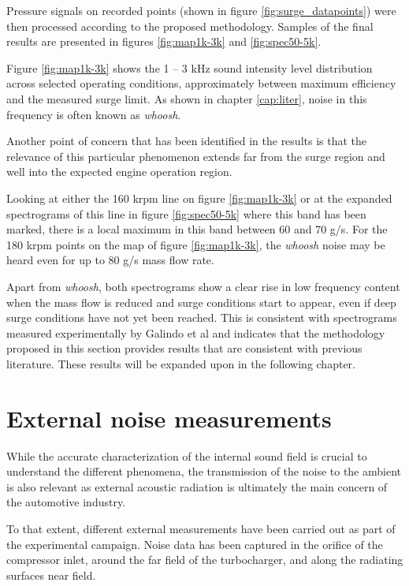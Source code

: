 Pressure signals on recorded points (shown in figure \ref{fig:surge_datapoints}) were then processed according to the proposed methodology. Samples of the final results are presented in figures \ref{fig:map1k-3k} and \ref{fig:spec50-5k}.

Figure \ref{fig:map1k-3k} shows the 1 -- 3 kHz sound intensity level distribution across selected operating conditions, approximately between maximum efficiency and the measured surge limit. As shown in chapter \ref{cap:liter}, noise in this frequency is often known as \emph{whoosh}.

Another point of concern that has been identified in the results is that the relevance of this particular phenomenon extends far from the surge region and well into the expected engine operation region.

Looking at either the 160 krpm line on figure \ref{fig:map1k-3k} or at the expanded spectrograms of this line in figure \ref{fig:spec50-5k} where this band has been marked, there is a local maximum in this band between 60 and 70 g/s. For the 180 krpm points on the map of figure \ref{fig:map1k-3k}, the \emph{whoosh} noise may be heard even for up to 80 g/s mass flow rate.

Apart from \emph{whoosh}, both spectrograms show a clear rise in low frequency content when the mass flow is reduced and surge conditions start to appear, even if deep surge conditions have not yet been reached. This is consistent with spectrograms measured experimentally by Galindo et al \cite{galindo2009effect} and indicates that the methodology proposed in this section provides results that are consistent with previous literature. These results will be expanded upon in the following chapter.

\section{External noise measurements}
\label{sec:method_external}

While the accurate characterization of the internal sound field is crucial to understand the different phenomena, the transmission of the noise to the ambient is also relevant as external acoustic radiation is ultimately the main concern of the automotive industry.

To that extent, different external measurements have been carried out as part of the experimental campaign. Noise data has been captured in the orifice of the compressor inlet, around the far field of the turbocharger, and along the radiating surfaces near field.

